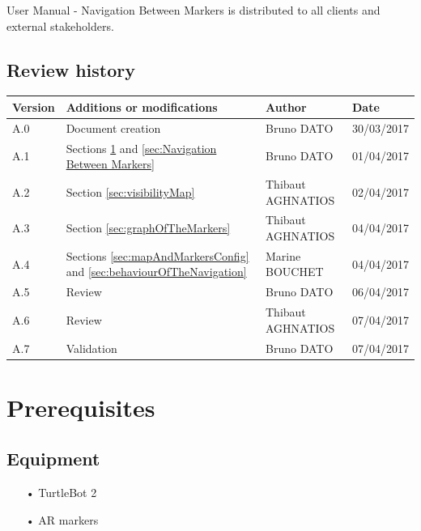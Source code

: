 \documentclass[10pt,a4paper]{article}
\begin{document}
User Manual - Navigation Between Markers is distributed to all clients and external stakeholders.

\subsection*{Review history}

\begin{center}
    \begin{tabular}{| l | l | l | l |}
    \hline
     \rowcolor{gray} Version & Additions or modifications & Author & Date \\ \hline
    A.0 & Document creation & Bruno DATO & 30/03/2017\\ \hline
    A.1 & Sections \ref{sec:Prerequisites} and \ref{sec:Navigation Between Markers} & Bruno DATO & 01/04/2017\\ \hline
    A.2 & Section \ref{sec:visibilityMap} & Thibaut AGHNATIOS & 02/04/2017\\ \hline
    A.3 & Section \ref{sec:graphOfTheMarkers} & Thibaut AGHNATIOS & 04/04/2017\\ \hline
    A.4 & Sections \ref{sec:mapAndMarkersConfig} and \ref{sec:behaviourOfTheNavigation} & Marine BOUCHET & 04/04/2017\\ \hline
    A.5 & Review  & Bruno DATO & 06/04/2017\\ \hline
    A.6 & Review  & Thibaut AGHNATIOS & 07/04/2017\\ \hline
    A.7 & Validation  & Bruno DATO & 07/04/2017\\ \hline
     
    \end{tabular}
\end{center}

\newpage
\tableofcontents
\newpage
	

\section{Prerequisites}
\label{sec:Prerequisites}

\subsection{Equipment}

\begin{itemize}
\item[•] TurtleBot 2
\item[•] AR markers 
\end{itemize}
\end{document}
